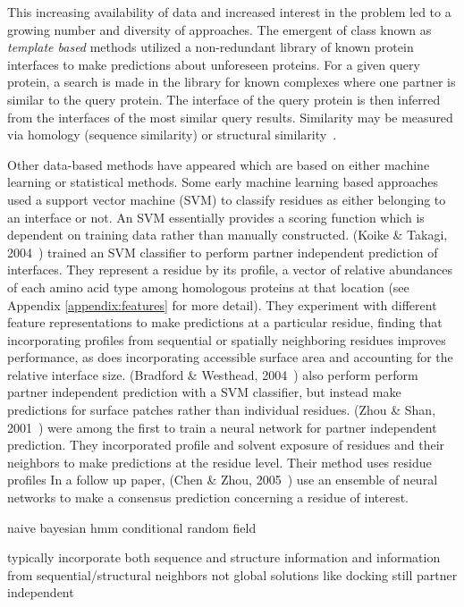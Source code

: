This increasing availability of data and increased interest in the problem led to a growing number and diversity of approaches.
The emergent of class known as \textit{template based} methods utilized a non-redundant library of known protein interfaces to make predictions about unforeseen proteins.
For a given query protein, a search is made in the library for known complexes where one partner is similar to the query protein.
The interface of the query protein is then inferred from the interfaces of the most similar query results.
Similarity may be measured via homology (sequence similarity) or structural similarity~\cite{esmaielbeiki2015}.

Other data-based methods have appeared which are based on either machine learning or statistical methods.
Some early machine learning based approaches used a support vector machine (SVM) to classify residues as either belonging to an interface or not.
An SVM essentially provides a scoring function which is dependent on training data rather than manually constructed.
(Koike \& Takagi, 2004~\cite{koike2004}) trained an SVM classifier to perform partner independent prediction of interfaces.
They represent a residue by its profile, a vector of relative abundances of each amino acid type among homologous proteins at that location (see Appendix \ref{appendix:features} for more detail).
They experiment with different feature representations to make predictions at a particular residue, finding that incorporating profiles from sequential or spatially neighboring residues improves performance, as does incorporating accessible surface area and accounting for the relative interface size.
(Bradford \& Westhead, 2004~\cite{bradford2004}) also perform perform partner independent prediction with a SVM classifier, but instead make predictions for surface patches rather than individual residues.
(Zhou \& Shan, 2001~\cite{zhou2001}) were among the first to train a neural network for partner independent prediction.
They incorporated profile and solvent exposure of residues and their neighbors to make predictions at the residue level.
Their method uses residue profiles
In a follow up paper, (Chen \& Zhou, 2005~\cite{chen2005}) use an ensemble of neural networks to make a consensus prediction concerning a residue of interest.

		naive bayesian
		hmm
		conditional random field
		
		
	typically incorporate both sequence and structure information and information from sequential/structural neighbors
	not global solutions like docking
	still partner independent
	
